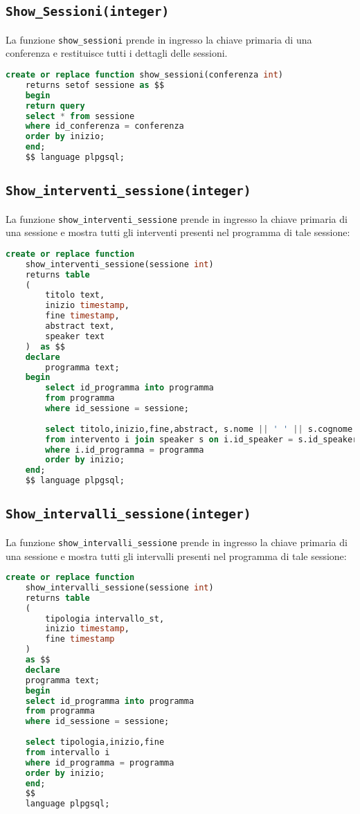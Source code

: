 \subsection{\texttt{Show\_Sessioni(integer)}}
La funzione \texttt{show\_sessioni} prende in ingresso la chiave primaria di una conferenza e restituisce tutti i dettagli delle sessioni.
\begin{lstlisting}[language=SQL, style=mystyle]
	create or replace function show_sessioni(conferenza int)
	returns setof sessione as $$
	begin
	return query
	select * from sessione
	where id_conferenza = conferenza
	order by inizio;
	end;
	$$ language plpgsql;
\end{lstlisting}
\subsection{\texttt{Show\_interventi\_sessione(integer)}}
La funzione \texttt{show\_interventi\_sessione} prende in ingresso la chiave primaria di una sessione e mostra tutti gli interventi presenti nel programma di tale sessione:
\begin{lstlisting}[language=SQL,style=mystyle]
	create or replace function 
	show_interventi_sessione(sessione int)
	returns table
	(
		titolo text,
		inizio timestamp,
		fine timestamp,
		abstract text,
		speaker text
	)  as $$
	declare 
		programma text;
	begin
		select id_programma into programma
		from programma
		where id_sessione = sessione;
	
		select titolo,inizio,fine,abstract, s.nome || ' ' || s.cognome as speaker
		from intervento i join speaker s on i.id_speaker = s.id_speaker
		where i.id_programma = programma
		order by inizio;
	end;
	$$ language plpgsql;
\end{lstlisting}

\subsection{\texttt{Show\_intervalli\_sessione(integer)}}
La funzione \texttt{show\_intervalli\_sessione} prende in ingresso la chiave primaria di una sessione e mostra tutti gli intervalli presenti nel programma di tale sessione:
\begin{lstlisting}[language=SQL,style=mystyle]
	create or replace function 
	show_intervalli_sessione(sessione int)
	returns table
	(
		tipologia intervallo_st,
		inizio timestamp,
		fine timestamp
	)  
	as $$
	declare 
	programma text;
	begin
	select id_programma into programma
	from programma
	where id_sessione = sessione;
	
	select tipologia,inizio,fine
	from intervallo i
	where id_programma = programma
	order by inizio;
	end;
	$$ 
	language plpgsql;
\end{lstlisting}
